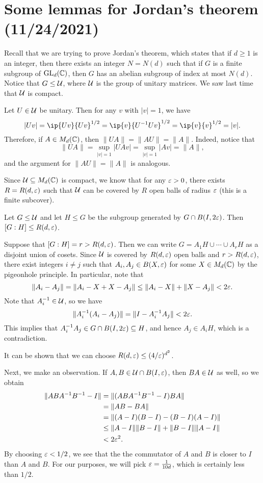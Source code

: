 \section{Some lemmas for Jordan's theorem (11/24/2021)}
Recall that we are trying to prove Jordan's theorem, which states that if 
$d \geq 1$ is an integer, then there exists an integer $N = N(d)$ such that 
if $G$ is a finite subgroup of $\operatorname{GL}_d(\mathbb{C})$, then $G$ has an abelian subgroup 
of index at most $N(d)$. Notice that $G \leq {\cal U}$, where ${\cal U}$ is the
group of unitary matrices. We saw last time that ${\cal U}$ is compact. 

Let $U \in {\cal U}$ be unitary. Then for any $v$ with $|v| = 1$, we have 
\[ |Uv| = \ip{Uv}{Uv}^{1/2} = \ip{v}{U^{-1}Uv}^{1/2} = \ip{v}{v}^{1/2} = |v|. \]
Therefore, if $A \in M_d(\mathbb{C})$, then $\|UA\| = \|AU\| = \|A\|$. Indeed, notice that 
\[ \|UA\| = \sup_{|v|=1} |UAv| = \sup_{|v|=1} |Av| = \|A\|, \] 
and the argument for $\|AU\| = \|A\|$ is analogous.  

Since ${\cal U} \subseteq M_d(\mathbb{C})$ is compact, we know that for any $\varepsilon > 0$, 
there exists $R = R(d, \varepsilon)$ such that ${\cal U}$ can be covered by $R$ 
open balls of radius $\varepsilon$ (this is a finite subcover). 

\begin{lemma}{}
    Let $G \leq {\cal U}$ and let $H \leq G$ be the subgroup generated by 
    $G \cap B(I, 2\varepsilon)$. Then $[G : H] \leq R(d, \varepsilon)$. 
\end{lemma}
\begin{pf}
    Suppose that $[G : H] = r > R(d, \varepsilon)$. Then we can write $G = 
    A_1H \cup \cdots \cup A_rH$ as a disjoint union of cosets. Since ${\cal U}$ 
    is covered by $R(d, \varepsilon)$ open balls and $r > R(d, \varepsilon)$, there exist 
    integers $i \neq j$ such that $A_i, A_j \in B(X, \varepsilon)$ for some 
    $X \in M_d(\mathbb{C})$ by the pigeonhole principle. In particular, note that 
    \[ \|A_i - A_j\| = \|A_i - X + X - A_j\| \leq \|A_i - X\| + \|X - A_j\| 
    < 2\varepsilon. \] 
    Note that $A_i^{-1} \in {\cal U}$, so we have 
    \[ \|A_i^{-1}(A_i - A_j)\| = \|I - A_i^{-1}A_j\| < 2\varepsilon. \] 
    This implies that $A_i^{-1}A_j \in G \cap B(I, 2\varepsilon) \subseteq H$, 
    and hence $A_j \in A_iH$, which is a contradiction. 
\end{pf}

It can be shown that we can choose $R(d, \varepsilon) \leq (4/\varepsilon)^{d^2}$. 

Next, we make an observation. If $A, B \in {\cal U} \cap B(I, \varepsilon)$, then 
$BA \in {\cal U}$ as well, so we obtain 
\begin{align*}
    \|ABA^{-1}B^{-1} - I\| 
    &= \|(ABA^{-1}B^{-1} - I)BA\| \\
    &= \|AB - BA\| \\
    &= \|(A-I)(B-I) - (B-I)(A-I)\| \\
    &\leq \|A-I\|\|B-I\| + \|B-I\|\|A-I\| \\ 
    &< 2\varepsilon^2. 
\end{align*}
By choosing $\varepsilon < 1/2$, we see that the the commutator of $A$ and $B$ 
is closer to $I$ than $A$ and $B$. For our purposes, we will pick 
$\varepsilon = \frac{1}{10d}$, which is certainly less than $1/2$. 

